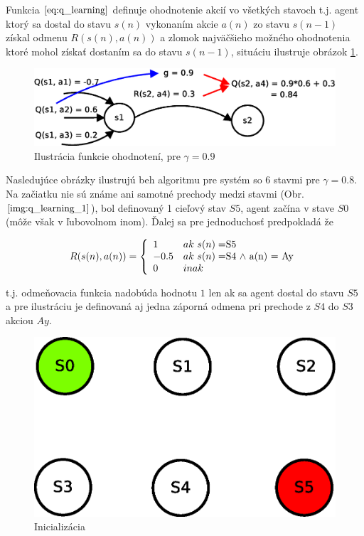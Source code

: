 Funkcia $\ref{eq:q_learning}$ definuje ohodnotenie akcií vo všetkých stavoch t.j.
agent ktorý sa dostal do stavu $s(n)$ vykonaním akcie $a(n)$ zo stavu
$s(n-1)$ získal odmenu $R(s(n),a(n))$ a zlomok najväčšieho možného ohodnotenia ktoré
mohol získať dostaním sa do stavu $s(n-1)$, situáciu ilustruje obrázok \ref{img:q_learning}.


\begin{figure}[!htb]
\center
\includegraphics[scale=.6]{../diagrams/q_learning_detail.eps}
\caption{Ilustrácia funkcie ohodnotení, pre $\gamma = 0.9$}
\label{img:q_learning}
\end{figure}

Nasledujúce obrázky ilustrujú beh algoritmu pre systém so 6 stavmi pre $\gamma = 0.8$.
Na začiatku nie sú známe ani samotné prechody medzi stavmi (Obr. $\ref{img:q_learning_1}$), bol definovaný
1 cieľový stav $S5$, agent začína v stave $S0$ (môže však v ľubovolnom inom).
Ďalej sa pre jednoduchosť predpokladá že

\begin{equation}
R(s(n), a(n)) =
\left\{
	\begin{array}{ll}
		1  & ak \ s(n) = $S5$ \\
    -0.5  & ak \ s(n) = $S4$ \ \wedge \ $a(n) = Ay$  \\
		0 & inak
	\end{array}
\right.
\label{eq:r_func_simple}
\end{equation}

t.j. odmeňovacia funkcia nadobúda hodnotu $1$ len ak sa agent dostal do stavu
$S5$ a pre ilustráciu je definovaná aj jedna záporná odmena pri prechode z $S4$ do
$S3$ akciou $Ay$.

\begin{figure}[!htb]
\center
\includegraphics[scale=.6]{../diagrams/q_learning_table_01.eps}
\caption{Inicializácia}
\label{img:q_learning_1}
\end{figure}


